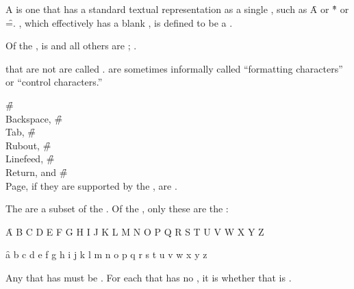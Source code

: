 A   is one that has a standard textual 
representation as a single , such as \f{A} or \f{*} or \f{=}.
, which effectively has a blank , is defined
to be a .

Of the ,
      is  
 and all others are ; \seesection\StandardChars.

 that are not  are called .
  are sometimes informally called
    ``formatting characters'' 
 or ``control characters.''

\f{\#\\Backspace},
\f{\#\\Tab},
\f{\#\\Rubout},
\f{\#\\Linefeed}, 
\f{\#\\Return}, and
\f{\#\\Page},
if they are supported by the ,
are .



\endsubsubsection%


The   are
a subset of the  .
Of the , only these are the  :

\f{A B C D E F G H I J K L M N O P Q R S T U V W X Y Z}

\f{a b c d e f g h i j k l m n o p q r s t u v w x y z}

Any   that has  
must be .
For each    
that has no ,
it is  whether 
that  is .


